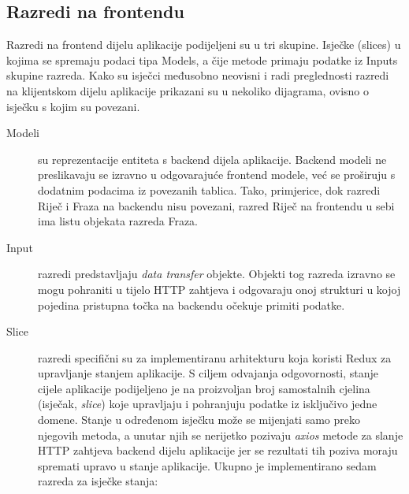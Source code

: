 \subsection{Razredi na frontendu}

Razredi na frontend dijelu aplikacije podijeljeni su u tri skupine. Isječke (slices) u kojima se spremaju podaci tipa Models, a čije metode primaju podatke iz Inputs skupine razreda. Kako su isječci međusobno neovisni i radi preglednosti razredi na klijentskom dijelu aplikacije prikazani su u nekoliko dijagrama, ovisno o isječku s kojim su povezani.
\begin{description}
	\item[Modeli] su reprezentacije entiteta s backend dijela aplikacije. Backend modeli ne preslikavaju se izravno u odgovarajuće frontend modele, već se proširuju s dodatnim podacima iz povezanih tablica. Tako, primjerice, dok razredi Riječ i Fraza na backendu nisu povezani, razred Riječ na frontendu u sebi ima listu objekata razreda Fraza.
	\item[Input] razredi predstavljaju \textit{data transfer} objekte. Objekti tog razreda izravno se mogu pohraniti u tijelo HTTP zahtjeva i odgovaraju onoj strukturi u kojoj  pojedina pristupna točka na backendu očekuje primiti podatke.
	\item[Slice] razredi specifični su za implementiranu arhitekturu koja koristi Redux za upravljanje stanjem aplikacije. S ciljem odvajanja odgovornosti, stanje cijele aplikacije podijeljeno je na proizvoljan broj samostalnih cjelina (isječak, \textit{slice}) koje upravljaju i pohranjuju podatke iz isključivo jedne domene. Stanje u određenom isječku može se mijenjati samo preko njegovih metoda, a unutar njih se nerijetko pozivaju \textit{axios} metode za slanje HTTP zahtjeva backend dijelu aplikacije jer se rezultati tih poziva moraju spremati upravo u stanje aplikacije. Ukupno je implementirano sedam razreda za isječke stanja:
	
	
\end{description}

